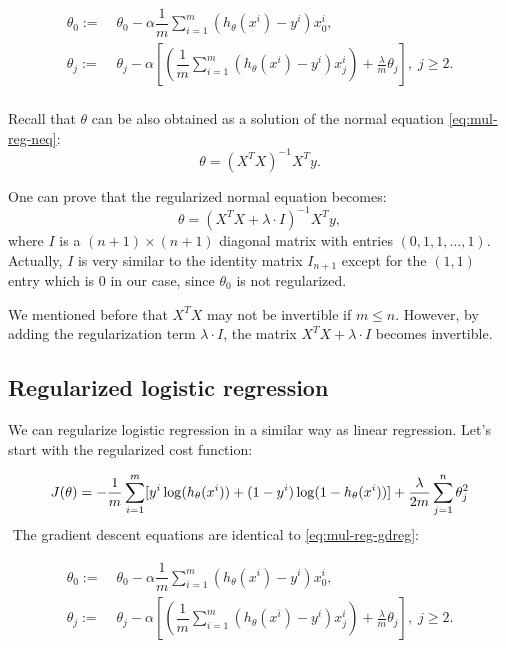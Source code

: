 \documentclass[a4paper,11pt]{report}
\begin{document}
\begin{equation}\label{eq:mul-reg-gdreg}
\begin{split}
\theta_0 := & \; \theta_0 - \alpha \dfrac{1}{m} \sum_{i=1}^m (h_\theta(x^{i}) - y^{i})x_0^{i}, \\
\theta_j := & \; \theta_j - \alpha \left[ \left( \dfrac{1}{m}\sum_{i=1}^m (h_\theta(x^{i}) - y^{i})x_j^{i} \right) + \frac{\lambda}{m}\theta_j \right], \; j\geq 2. \\
\end{split}
\end{equation}

Recall that $\theta$ can be also obtained as a solution of the normal equation \eqref{eq:mul-reg-neq}: $$\theta = (X^TX)^{-1}X^Ty.$$

One can prove that the regularized normal equation becomes: $$\theta = (X^TX +\lambda \cdot I)^{-1}X^Ty,$$
where $I$ is a $(n+1)\times (n+1)$ diagonal matrix with entries $(0,1,1,\ldots, 1)$. Actually, $I$ is very similar to the identity matrix $I_{n+1}$ except for the $(1,1)$ entry which is 0 in our case, since $\theta_0$ is not regularized.

We mentioned before that $X^TX$ may not be invertible if $m \leq n$. However, by adding the regularization term $\lambda\cdot I$, the matrix $X^TX +\lambda\cdot I$ becomes invertible.

\subsection*{Regularized logistic regression}

We can regularize logistic regression in a similar way as linear regression. Let's start with the regularized cost function:

\begin{equation}\label{eq:log-reg-costreg}
J(\theta) = - \dfrac{1}{m} \sum_{i=1}^m [ y^{i}\log (h_\theta (x^{i})) + (1 - y^{i}) \log (1 - h_\theta(x^{i}))\large] + \frac{\lambda}{2m}\sum_{j=1}^n \theta_j^2
\end{equation}
​	
The gradient descent equations are identical to \eqref{eq:mul-reg-gdreg}:

\begin{equation*}
\begin{split}
\theta_0 := & \; \theta_0 - \alpha \dfrac{1}{m} \sum_{i=1}^m (h_\theta(x^{i}) - y^{i})x_0^{i}, \\
\theta_j := & \; \theta_j - \alpha \left[ \left( \dfrac{1}{m}\sum_{i=1}^m (h_\theta(x^{i}) - y^{i})x_j^{i} \right) + \frac{\lambda}{m}\theta_j \right], \; j\geq 2. \\
\end{split}
\end{equation*}
\end{document}
